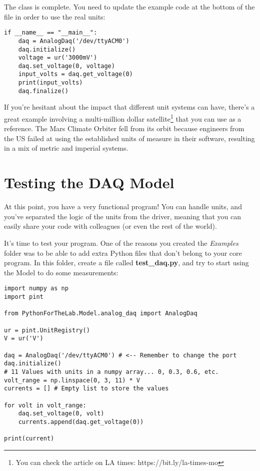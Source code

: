 The class is complete. You need to update the example code at the bottom of the file in order to use the real units:

\begin{verbatim}
if __name__ == "__main__":
    daq = AnalogDaq('/dev/ttyACM0')
    daq.initialize()
    voltage = ur('3000mV')
    daq.set_voltage(0, voltage)
    input_volts = daq.get_voltage(0)
    print(input_volts)
    daq.finalize()
\end{verbatim}

If you're hesitant about the impact that different unit systems can have, there's a great example involving a multi-million dollar satellite\footnote{You can check the article on LA times: https://bit.ly/la-times-mo} that you can use as a reference. The Mars Climate Orbiter fell from its orbit because engineers from the US failed at using the established units of measure in their software, resulting in a mix of metric and imperial systems.

\section{Testing the DAQ Model}\label{sec:testing-the-daq-model}
At this point, you have a very functional program! You can handle units, and you've separated the logic of the units from the driver, meaning that you can easily share your code with colleagues (or even the rest of the world).

It's time to test your program. One of the reasons you created the \emph{Examples} folder was to be able to add extra Python files that don't belong to your core program. In this folder, create a file called \textbf{test\_daq.py}, and try to start using the Model to do some measurements:

\begin{verbatim}
import numpy as np
import pint

from PythonForTheLab.Model.analog_daq import AnalogDaq

ur = pint.UnitRegistry()
V = ur('V')

daq = AnalogDaq('/dev/ttyACM0') # <-- Remember to change the port
daq.initialize()
# 11 Values with units in a numpy array... 0, 0.3, 0.6, etc.
volt_range = np.linspace(0, 3, 11) * V
currents = [] # Empty list to store the values

for volt in volt_range:
    daq.set_voltage(0, volt)
    currents.append(daq.get_voltage(0))

print(current)
\end{verbatim}

